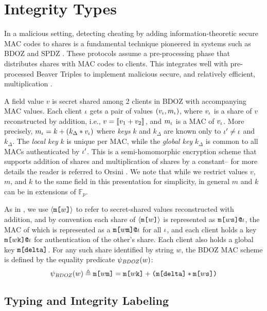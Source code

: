 \section{Integrity Types}
\label{section-ipj}

In a malicious setting, detecting cheating by adding
information-theoretic secure MAC codes to shares is a fundamental
technique pioneered in systems such as BDOZ and SPDZ
\cite{SPDZ1,SPDZ2,BDOZ,10.1007/978-3-030-68869-1_3}.  These protocols
assume a pre-processing phase that distributes shares with MAC codes
to clients.  This integrates well with pre-processed Beaver Triples to
implement malicious secure, and relatively efficient, multiplication
\cite{evans2018pragmatic}.

A field value $v$ is secret shared among 2 clients in BDOZ with
accompanying MAC values.  Each client $\iota$ gets a pair of values
$(v_\iota,m_\iota)$, where $v_\iota$ is a share of $v$ reconstructed by
addition, i.e., $v = \llbracket v_1 + v_2 \rrbracket_{}$, and $m_\iota$ is a MAC of
$v_\iota$.  More precisely, $m_\iota = k + (k_\Delta * v_\iota)$ where
\emph{keys} $k$ and $k_\Delta$ are known only to $\iota' \ne \iota$ and
$k_\Delta$. The \emph{local key} $k$ is unique per MAC, while the
\emph{global key} $k_\Delta$ is common to all MACs authenticated by
$\iota'$. This is a semi-homomorphic encryption scheme that supports
addition of shares and multiplication of shares by a constant-- for
more details the reader is referred to Orsini
\cite{10.1007/978-3-030-68869-1_3}. We note that while we restrict
values $v$, $m$, and $k$ to the same field in this presentation for
simplicity, in general $m$ and $k$ can be in extensions of
$\mathbb{F}_p$.

As in \cite{skalka-near-ppdp24}, we use $\langle \texttt{m[}w\texttt{]} \rangle$ to refer to
secret-shared values reconstructed with addition, and by
convention each share of $\langle \texttt{m[}w\texttt{]} \rangle$ is represented as
$\texttt{m[}w\texttt{s}\texttt{]}\texttt{@}\iota$, the MAC of which is represented as a
$\texttt{m[}w\texttt{m}\texttt{]}\texttt{@}\iota$ for all $\iota$, and each client holds a
key $\texttt{m[}w\texttt{k}\texttt{]}\texttt{@}\iota$ for authentication of the other's
share. Each client also holds a global key $\texttt{m[}\texttt{delta}\texttt{]}$. For
any such share identified by string $w$, the BDOZ MAC scheme is defined 
by the equality predicate $\psi_{\mathit{BDOZ}}(w)$:
$$
\psi_{\mathit{BDOZ}}(w) \triangleq
\texttt{m[}w\texttt{m}\texttt{]} = \texttt{m[}w\texttt{k}\texttt{]} + \texttt{(}\texttt{m[}\texttt{delta}\texttt{]} *
\texttt{m[}w\texttt{s}\texttt{]}\texttt{)}
$$

\subsection{Typing and Integrity Labeling}


